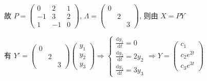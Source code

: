 \begin{enumerate}
                   故 \( P = \begin{pmatrix}
                       0  & 2  & 1 \\
                       -1 & 3  & 2 \\
                       1  & -1 & 0
                   \end{pmatrix} \), \( \Lambda = \begin{pmatrix}
                       0 &   &   \\
                         & 2 &   \\
                         &   & 3
                   \end{pmatrix} \), 则由 \( X = P Y \)

                   有 \( Y' = \begin{pmatrix}
                       0 &   &   \\
                         & 2 &   \\
                         &   & 3
                   \end{pmatrix} \begin{pmatrix}
                       y_{1} \\
                       y_{2} \\
                       y_{3}
                   \end{pmatrix} \Rightarrow \begin{cases}
                       \frac{\mathrm{d}y_{1}}{\mathrm{d}t} = 0      \\
                       \frac{\mathrm{d}y_{2}}{\mathrm{d}t} = 2y_{2} \\
                       \frac{\mathrm{d}y_{3}}{\mathrm{d}t} = 3y_{3}
                   \end{cases} \Rightarrow Y = \begin{pmatrix}
                       c_{1}       \\
                       c_{2}e^{2t} \\
                       c_{3}e^{3t}
                   \end{pmatrix} \)


\end{enumerate}
